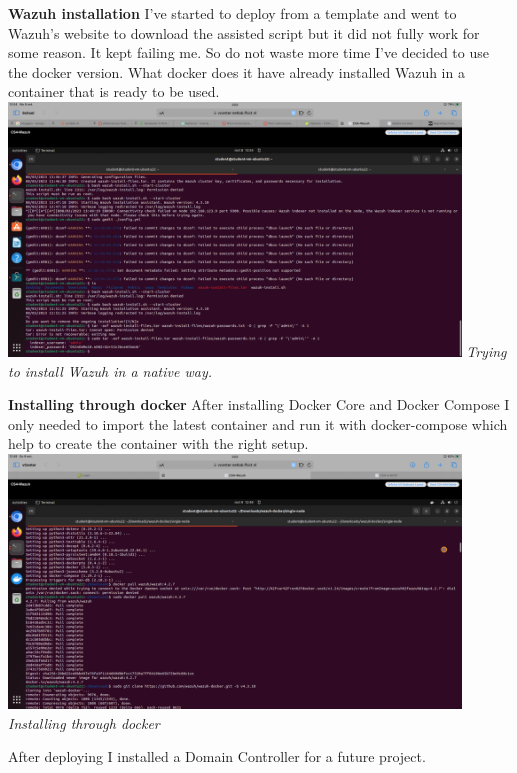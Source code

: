 \documentclass[12pt, letterpaper]{article}
\begin{document}
\textbf{Wazuh installation}
I've started to deploy from a template and went to Wazuh's website to download the assisted script but it did not fully work for some reason. It kept failing me. So do not waste more time I've decided to use the docker version. What docker does it have already installed Wazuh in a container that is ready to be used. 
\hfill\break
\includegraphics[width=0.9\textwidth]{fotos/Week 4/Trying to install wazuh native.png}
\break
\emph{Trying to install Wazuh in a native way.}

\hfill\break
\hfill\break
\textbf{Installing through docker}
\hfill\break
After installing Docker Core and Docker Compose I only needed to import the latest container and run it with docker-compose which help to create the container with the right setup.
\hfill\break
\includegraphics[width=0.9\textwidth]{fotos/Week 4/Wazuh docker install.png}
\break
\emph{Installing through docker}

After deploying I installed a Domain Controller for a future project. 
\newpage
\end{document}

